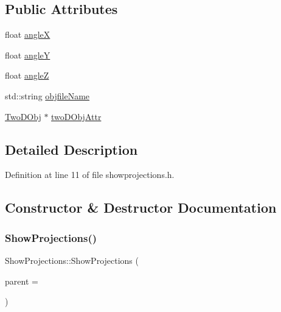 \subsection*{Public Attributes}
\begin{DoxyCompactItemize}
\item 
float \mbox{\hyperlink{class_show_projections_a87d1471d46ccad3a64ef5e4d3cc34933}{angleX}}
\item 
float \mbox{\hyperlink{class_show_projections_a161c729ded314da8f1920b8ee5651f83}{angleY}}
\item 
float \mbox{\hyperlink{class_show_projections_acecb344bb7e7cfe5610ebaa19d31c90b}{angleZ}}
\item 
std\+::string \mbox{\hyperlink{class_show_projections_abcc6c94ecf29145f8ae94f02df4d8f50}{objfile\+Name}}
\item 
\mbox{\hyperlink{class_two_d_obj}{Two\+D\+Obj}} $\ast$ \mbox{\hyperlink{class_show_projections_a2fcd6111dcc0b378a7908a4e0ea2cd96}{two\+D\+Obj\+Attr}}
\end{DoxyCompactItemize}


\subsection{Detailed Description}


Definition at line 11 of file showprojections.\+h.



\subsection{Constructor \& Destructor Documentation}
\mbox{\label{class_show_projections_a9d5dd82bfa3dc9b28aa04e4d643cd38b}} 
\subsubsection{\texorpdfstring{Show\+Projections()}{ShowProjections()}}
{\footnotesize\ttfamily Show\+Projections\+::\+Show\+Projections (\begin{DoxyParamCaption}\item[{Q\+Widget $\ast$}]{parent = {} }\end{DoxyParamCaption})\hspace{0.3cm}{\ttfamily [explicit]}}




